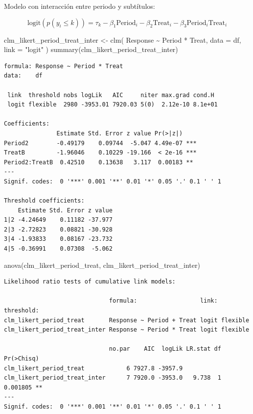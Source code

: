 \documentclass[
  letterpaper,
  DIV=11,
  numbers=noendperiod]{scrartcl}
\newenvironment{Shaded}{\begin{snugshade}}{\end{snugshade}}
\newcommand{\AttributeTok}[1]{\textcolor[rgb]{0.40,0.45,0.13}{#1}}
\newcommand{\FunctionTok}[1]{\textcolor[rgb]{0.28,0.35,0.67}{#1}}
\newcommand{\NormalTok}[1]{\textcolor[rgb]{0.00,0.23,0.31}{#1}}
\newcommand{\OtherTok}[1]{\textcolor[rgb]{0.00,0.23,0.31}{#1}}
\newcommand{\SpecialCharTok}[1]{\textcolor[rgb]{0.37,0.37,0.37}{#1}}
\newcommand{\StringTok}[1]{\textcolor[rgb]{0.13,0.47,0.30}{#1}}
\begin{document}
Modelo con interacción entre periodo y subtítulos:

\[
\text{logit}(p(y_i \leq k)) = \tau_k - \beta_1 \text{Period}_i - \beta_2 \text{Treat}_i - \beta_3 \text{Period}_i\text{Treat}_i
\]

\begin{Shaded}
\begin{Highlighting}[]
\NormalTok{clm\_likert\_period\_treat\_inter }\OtherTok{\textless{}{-}}
    \FunctionTok{clm}\NormalTok{(}
\NormalTok{        Response }\SpecialCharTok{\textasciitilde{}}\NormalTok{ Period }\SpecialCharTok{*}\NormalTok{ Treat,}
        \AttributeTok{data =}\NormalTok{ df, }\AttributeTok{link =} \StringTok{"logit"}
\NormalTok{    )}
\FunctionTok{summary}\NormalTok{(clm\_likert\_period\_treat\_inter)}
\end{Highlighting}
\end{Shaded}

\begin{verbatim}
formula: Response ~ Period * Treat
data:    df

 link  threshold nobs logLik   AIC     niter max.grad cond.H 
 logit flexible  2980 -3953.01 7920.03 5(0)  2.12e-10 8.1e+01

Coefficients:
               Estimate Std. Error z value Pr(>|z|)    
Period2        -0.49179    0.09744  -5.047 4.49e-07 ***
TreatB         -1.96046    0.10229 -19.166  < 2e-16 ***
Period2:TreatB  0.42510    0.13638   3.117  0.00183 ** 
---
Signif. codes:  0 '***' 0.001 '**' 0.01 '*' 0.05 '.' 0.1 ' ' 1

Threshold coefficients:
    Estimate Std. Error z value
1|2 -4.24649    0.11182 -37.977
2|3 -2.72823    0.08821 -30.928
3|4 -1.93833    0.08167 -23.732
4|5 -0.36991    0.07308  -5.062
\end{verbatim}

\begin{Shaded}
\begin{Highlighting}[]
\FunctionTok{anova}\NormalTok{(clm\_likert\_period\_treat, clm\_likert\_period\_treat\_inter)}
\end{Highlighting}
\end{Shaded}

\begin{verbatim}
Likelihood ratio tests of cumulative link models:
 
                              formula:                  link: threshold:
clm_likert_period_treat       Response ~ Period + Treat logit flexible  
clm_likert_period_treat_inter Response ~ Period * Treat logit flexible  

                              no.par    AIC  logLik LR.stat df Pr(>Chisq)   
clm_likert_period_treat            6 7927.8 -3957.9                         
clm_likert_period_treat_inter      7 7920.0 -3953.0   9.738  1   0.001805 **
---
Signif. codes:  0 '***' 0.001 '**' 0.01 '*' 0.05 '.' 0.1 ' ' 1
\end{verbatim}
\end{document}
